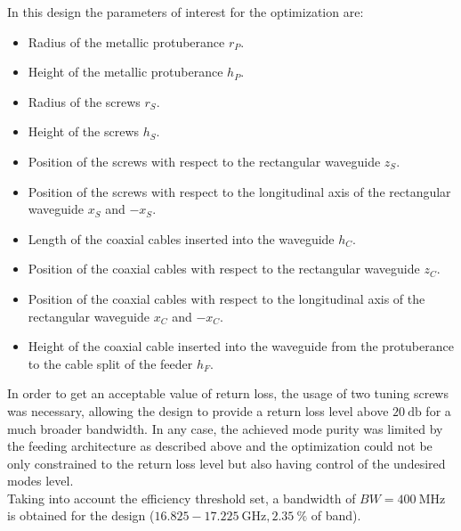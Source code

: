 \documentclass[english,twoside]{article}
\begin{document}
		In this design the parameters of interest for the optimization are:
		\begin{itemize}
			\item Radius of the metallic protuberance $r_P$.
			\item Height of the metallic protuberance $h_P$.
			
			\item Radius of the screws $r_S$.
			\item Height of the screws $h_S$.
			\item Position of the screws with respect to the rectangular waveguide $z_S$.
			\item Position of the screws with respect to the longitudinal axis of the rectangular waveguide $x_S$ and $-x_S$.
			
			\item Length of the coaxial cables inserted into the waveguide $h_C$.
			\item Position of the coaxial cables with respect to the rectangular waveguide $z_C$. 
			\item Position of the coaxial cables with respect to the longitudinal axis of the rectangular waveguide $x_C$ and $-x_C$.
			\item Height of the coaxial cable inserted into the waveguide from the protuberance to the cable split of the feeder $h_F$.
		\end{itemize}
	
		In order to get an acceptable value of return loss, the usage of two tuning screws was necessary, allowing the design to provide a return loss level above $\SI{20}{\decibel}$ for a much broader bandwidth. In any case, the achieved mode purity was limited by the feeding architecture as described above and the optimization could not be only constrained to the return loss level but also having control of the undesired modes level.\\
		
		Taking into account the efficiency threshold set, a bandwidth of $BW=\SI{400}{\mega\hertz}$ is obtained for the design ($\num{16.825}-\SI{17.225}{\giga\hertz}, \SI{2.35}{\percent}$ of band).
	
\end{document}
